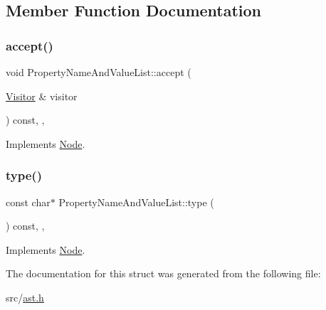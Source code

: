 \subsection{Member Function Documentation}
\mbox{\label{struct_property_name_and_value_list_a9de0000cc5d14bb2c24d643fe3dab043}} 
\subsubsection{\texorpdfstring{accept()}{accept()}}
{\footnotesize\ttfamily void Property\+Name\+And\+Value\+List\+::accept (\begin{DoxyParamCaption}\item[{\hyperlink{struct_visitor}{Visitor} \&}]{visitor }\end{DoxyParamCaption}) const\hspace{0.3cm}{\ttfamily [inline]}, {\ttfamily [override]}, {\ttfamily [virtual]}}



Implements \hyperlink{struct_node_a10bd7af968140bbf5fa461298a969c71}{Node}.

\mbox{\label{struct_property_name_and_value_list_af7fee32b31b1e3c163de8344988307c8}} 
\subsubsection{\texorpdfstring{type()}{type()}}
{\footnotesize\ttfamily const char$\ast$ Property\+Name\+And\+Value\+List\+::type (\begin{DoxyParamCaption}{ }\end{DoxyParamCaption}) const\hspace{0.3cm}{\ttfamily [inline]}, {\ttfamily [override]}, {\ttfamily [virtual]}}



Implements \hyperlink{struct_node_a82f29420d0a38efcc370352528e94e9b}{Node}.



The documentation for this struct was generated from the following file\+:\begin{DoxyCompactItemize}
\item 
src/\hyperlink{ast_8h}{ast.\+h}\end{DoxyCompactItemize}
